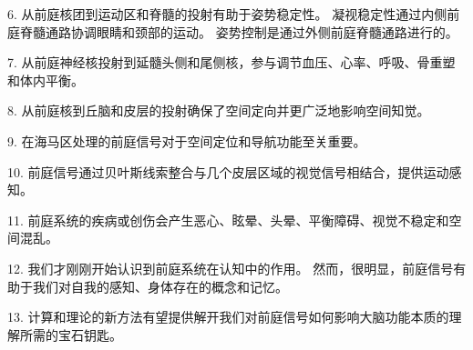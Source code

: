 6. 从前庭核团到运动区和脊髓的投射有助于姿势稳定性。 凝视稳定性通过内侧前庭脊髓通路协调眼睛和颈部的运动。 姿势控制是通过外侧前庭脊髓通路进行的。 

7. 从前庭神经核投射到延髓头侧和尾侧核，参与调节血压、心率、呼吸、骨重塑和体内平衡。 

8. 从前庭核到丘脑和皮层的投射确保了空间定向并更广泛地影响空间知觉。 

9. 在海马区处理的前庭信号对于空间定位和导航功能至关重要。 

10. 前庭信号通过贝叶斯线索整合与几个皮层区域的视觉信号相结合，提供运动感知。 

11. 前庭系统的疾病或创伤会产生恶心、眩晕、头晕、平衡障碍、视觉不稳定和空间混乱。 

12. 我们才刚刚开始认识到前庭系统在认知中的作用。 然而，很明显，前庭信号有助于我们对自我的感知、身体存在的概念和记忆。 

13. 计算和理论的新方法有望提供解开我们对前庭信号如何影响大脑功能本质的理解所需的宝石钥匙。



